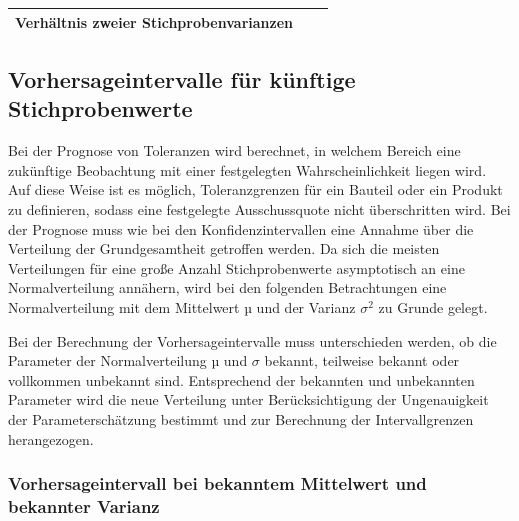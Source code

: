 \begin{table}[H]
{\begin{tabular}{| c | c | c |}
\parbox[c][1in][c]{1.5in}{\centering{}\selectfont\textbf{Verh\"{a}ltnis zweier Stichprobenvarianzen}} & 
\parbox[c][1in][c]{2.4in}{\centering{}} & 
\parbox[c][1in][c]{2.4in}{\centering{}}\\ \hline

\end{tabular}%
}
\label{tab:fivetwelve}
\end{table}

\clearpage

\subsection{Vorhersageintervalle f\"{u}r k\"{u}nftige Stichprobenwerte}

\noindent Bei der Prognose von Toleranzen wird berechnet, in welchem Bereich eine zuk\"{u}nftige Beobachtung mit einer festgelegten Wahrscheinlichkeit liegen wird. Auf diese Weise ist es m\"{o}glich, Toleranzgrenzen f\"{u}r ein Bauteil oder ein Produkt zu definieren, sodass eine festgelegte Ausschussquote nicht \"{u}berschritten wird. Bei der Prognose muss wie bei den Konfidenzintervallen eine Annahme \"{u}ber die Verteilung der Grundgesamtheit getroffen werden. Da sich die meisten Verteilungen f\"{u}r eine gro{\ss}e Anzahl Stichprobenwerte asymptotisch an eine Normalverteilung ann\"{a}hern, wird bei den folgenden Betrachtungen eine Normalverteilung mit dem Mittelwert µ und der Varianz $\sigma^{2}$ zu Grunde gelegt.\noindent

\noindent Bei der Berechnung der Vorhersageintervalle muss unterschieden werden, ob die Parameter der Normalverteilung µ und $\sigma$ bekannt, teilweise bekannt oder vollkommen unbekannt sind. Entsprechend der bekannten und unbekannten Parameter wird die neue Verteilung unter Ber\"{u}cksichtigung der Ungenauigkeit der Parametersch\"{a}tzung bestimmt und zur Berechnung der Intervallgrenzen herangezogen.

\subsubsection{Vorhersageintervall bei bekanntem Mittelwert und bekannter Varianz}

